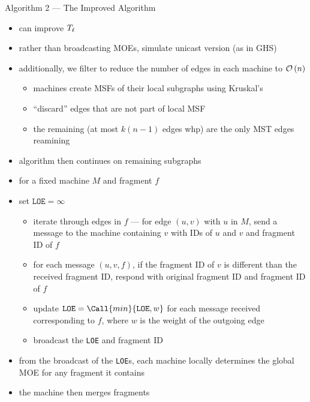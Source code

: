 \begin{frame}{Algorithm 2 --- The Improved Algorithm}
    \begin{itemize}
        \item can improve $T_{\ell}$
        \item rather than broadcasting MOEs, simulate unicast version (as in GHS)
        \item additionally, we filter to reduce the number of edges in each machine to $\mathcal{O}\left(n\right)$
              \begin{itemize}
                  \item machines create MSFs of their local subgraphs using Kruskal's
                  \item ``discard'' edges that are not part of local MSF
                  \item the remaining (at most $k(n-1)$ edges whp) are the only MST edges reamining
              \end{itemize}
        \item algorithm then continues on remaining subgraphs
    \end{itemize}
\end{frame}

\begin{frame}
    \begin{itemize}
        \item for a fixed machine $M$ and fragment $f$
        \item set $\texttt{LOE} = \infty$
              \begin{itemize}
                  \item iterate through edges in $f$ --- for edge $(u, v)$ with $u$ in $M$, send a message to the machine containing $v$ with IDs of $u$ and $v$ and fragment ID of $f$
                  \item for each message $(u, v, f)$, if the fragment ID of $v$ is different than the received fragment ID, respond with original fragment ID and fragment ID of $f$
                  \item update $\texttt{LOE} = \Call{min}{\texttt{LOE}, w}$ for each message received corresponding to $f$, where $w$ is the weight
                        of the outgoing edge
                \item broadcast the \texttt{LOE} and fragment ID
              \end{itemize}
        \item from the broadcast of the \texttt{LOE}s, each machine locally determines the global MOE for any fragment it contains
        \item the machine then merges fragments
    \end{itemize}
\end{frame}

